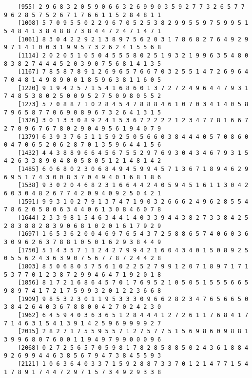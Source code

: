 \documentclass{article}
\begin{document}
\begin{itemize}
\begin{scriptsize}
\begin{verbatim}
	[955] 2 9 6 8 3 2 0 5 9 0 6 6 3 2 6 9 9 0 3 5 9 2 7 7 3 2 6 5 7 7 9 6 2 8 5 7 5 2 6 7 1 7 6 6 1 1 5 2 8 4 8 1 1
	[1008] 5 7 0 9 5 5 0 2 2 9 6 7 0 5 2 5 3 8 2 9 9 5 5 9 7 5 9 9 5 1 5 4 8 4 1 3 8 4 8 8 7 3 8 4 4 7 2 4 7 1 4 7 1
	[1061] 8 3 0 4 2 2 9 2 1 3 8 9 7 5 6 2 0 3 1 7 8 6 8 2 7 6 4 9 2 9 9 7 1 4 1 0 0 3 1 9 9 5 7 3 2 6 2 4 1 5 5 6 8
	[1114] 2 0 2 0 5 1 0 5 0 4 5 5 5 8 0 2 5 1 9 3 2 1 9 9 6 3 5 4 8 0 8 3 8 2 7 4 4 4 5 2 0 3 9 0 7 5 6 8 1 4 1 3 5
	[1167] 7 8 5 8 7 8 9 1 2 6 9 6 5 7 6 6 7 0 3 2 5 5 1 4 7 2 6 9 6 4 7 0 4 8 1 4 9 8 9 0 0 1 8 5 9 6 3 8 1 1 6 0 5
	[1220] 9 1 9 4 2 5 7 1 5 4 1 6 8 6 0 1 3 7 2 7 2 4 9 6 4 4 7 9 3 1 7 4 8 5 3 8 0 2 5 0 0 9 5 2 7 5 0 9 8 0 5 5 2
	[1273] 5 7 0 8 8 7 1 0 2 8 4 5 4 7 8 8 8 4 6 1 0 7 0 3 4 1 4 0 5 8 7 9 6 5 8 7 7 0 6 9 0 8 9 6 7 3 2 6 4 1 3 1 5
	[1326] 3 0 1 3 3 0 8 9 2 4 1 5 3 6 7 2 2 2 2 1 2 3 4 7 7 8 1 6 6 7 2 7 0 9 6 7 6 7 8 0 2 9 0 4 9 5 6 1 9 4 0 7 9
	[1379] 6 3 9 3 7 6 5 1 1 5 9 2 5 0 5 6 6 0 3 8 4 4 4 0 5 7 0 8 6 0 0 4 7 0 6 5 2 0 6 2 8 7 0 1 3 5 9 6 4 4 1 5 6
	[1432] 4 4 3 8 8 9 6 6 4 5 6 7 5 5 2 9 7 6 9 3 0 4 3 4 6 7 9 3 1 5 4 2 6 3 3 8 9 0 4 8 0 5 8 0 5 1 2 1 4 8 1 4 2
	[1485] 6 0 6 8 0 2 3 0 6 8 4 9 4 5 9 9 4 5 7 1 3 6 7 1 8 9 4 6 2 9 6 9 5 1 7 4 3 0 0 8 3 7 0 4 9 4 0 1 6 8 1 8 6
	[1538] 9 3 0 2 0 4 6 8 2 3 1 6 6 4 4 2 4 0 5 9 4 5 1 6 1 1 3 0 4 2 6 0 3 0 4 8 2 6 7 7 4 2 0 9 4 0 9 2 5 0 4 2 1
	[1591] 9 9 3 1 0 2 7 9 1 3 7 4 7 1 9 0 3 2 6 6 6 2 4 9 6 2 8 5 5 4 7 8 6 2 0 5 8 0 6 3 4 4 0 6 1 3 0 8 4 6 0 7 8
	[1644] 2 3 3 9 8 1 5 4 6 3 4 4 1 4 0 3 3 9 4 4 3 8 2 7 3 3 8 4 2 5 2 8 3 8 8 2 8 3 9 0 6 8 1 0 2 0 1 6 1 7 9 2 9
	[1697] 1 6 5 3 6 2 0 0 4 6 9 7 6 5 4 3 7 2 5 8 8 6 5 7 4 0 6 0 3 6 3 0 9 6 2 6 3 7 8 8 1 0 5 0 1 6 2 9 3 8 4 4 9
	[1750] 5 1 4 3 5 7 1 1 2 4 2 7 9 9 4 2 1 6 0 4 3 4 0 1 5 0 8 9 2 5 0 5 5 6 2 4 3 6 3 9 0 7 5 6 7 7 8 7 2 4 4 2 8
	[1803] 8 5 0 6 8 0 5 7 5 6 1 0 2 2 5 2 7 9 9 1 2 0 7 1 8 9 7 1 7 1 5 3 7 7 0 1 2 3 8 7 2 9 9 4 6 4 7 1 9 2 0 1 8
	[1856] 8 1 7 2 1 6 8 6 4 5 7 0 1 7 6 9 5 2 1 0 5 0 5 1 5 5 5 6 6 5 9 8 9 7 4 1 7 2 1 7 5 9 9 3 2 0 1 2 2 3 6 6 8
	[1909] 9 8 5 3 2 3 0 1 1 9 5 3 3 3 0 9 6 6 2 8 2 3 4 7 6 5 6 6 5 0 3 8 4 2 6 4 0 3 6 7 8 8 0 0 4 2 7 0 2 4 2 3 0
	[1962] 6 4 5 9 4 0 3 6 3 6 5 1 2 8 4 4 4 1 2 7 2 6 1 1 7 6 8 4 1 7 7 1 4 6 3 1 5 4 1 3 9 1 4 2 5 9 6 9 9 9 9 2 7
	[2015] 2 8 2 7 1 7 5 5 9 5 5 7 1 2 7 5 7 7 5 1 5 6 9 8 6 0 9 8 8 1 3 9 9 6 8 0 7 6 0 0 1 1 9 4 9 7 9 9 0 0 0 9 6
	[2068] 0 2 7 2 5 6 5 7 0 5 9 8 1 7 8 2 8 5 8 8 5 0 2 4 3 6 1 8 8 4 9 2 6 9 9 4 4 6 3 8 5 6 7 9 4 7 3 8 4 5 5 9 3
	[2121] 1 0 6 3 6 4 0 3 3 7 1 5 9 2 8 8 7 3 3 7 0 1 2 1 4 7 7 1 5 4 1 7 8 9 1 7 4 4 7 2 9 7 1 5 7 3 4 9 2 9 3 3 8

\end{verbatim}
\end{scriptsize}
\end{itemize}
\end{document}
